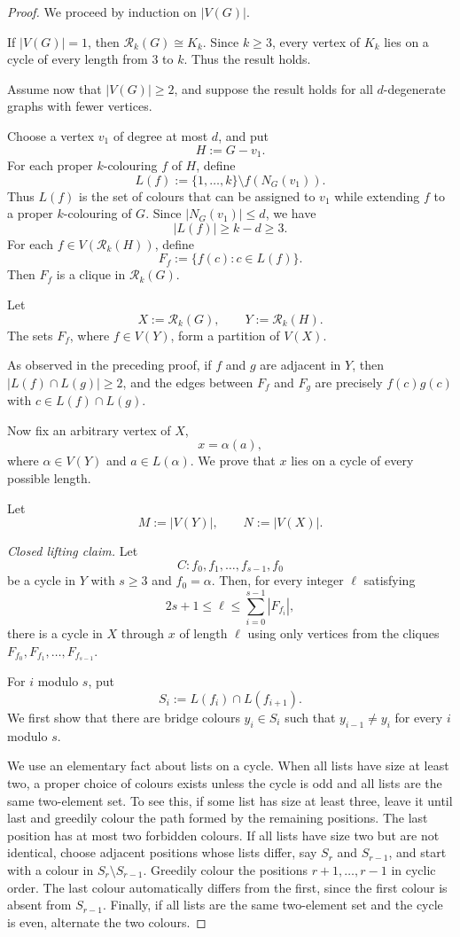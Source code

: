 \documentclass[11pt]{article}
\theoremstyle{remark}
\newcommand{\Rk}{\mathcal R_k}
\numberwithin{equation}{section}
\begin{document}
\begin{proof}
We proceed by induction on $|V(G)|$.

If $|V(G)|=1$, then $\Rk(G)\cong K_k$. Since $k\ge 3$,
every vertex of $K_k$ lies on a cycle of every length from $3$ to $k$.
Thus the result holds.

Assume now that $|V(G)|\ge 2$, and suppose the result holds for all
$d$-degenerate graphs with fewer vertices.

Choose a vertex $v_1$ of degree at most $d$, and put
\[
H:=G-v_1.
\]
For each proper $k$-colouring $f$ of $H$, define
\[
L(f):=\{1,\ldots,k\}\setminus f(N_G(v_1)).
\]
Thus $L(f)$ is the set of colours that can be assigned to $v_1$ while
extending $f$ to a proper $k$-colouring of $G$. Since
$|N_G(v_1)|\le d$, we have
\[
|L(f)|\ge k-d\ge 3.
\]
For each $f\in V(\Rk(H))$, define
\[
F_f:=\{f(c):c\in L(f)\}.
\]
Then $F_f$ is a clique in $\Rk(G)$.

Let
\[
X:=\Rk(G),\qquad Y:=\Rk(H).
\]
The sets $F_f$, where $f\in V(Y)$, form a partition of $V(X)$.

As observed in the preceding proof, if $f$ and $g$ are adjacent in $Y$,
then $|L(f)\cap L(g)|\ge 2$, and the edges between $F_f$ and $F_g$ are
precisely $f(c)g(c)$ with $c\in L(f)\cap L(g)$.

Now fix an arbitrary vertex of $X$,
\[
x=\alpha(a),
\]
where $\alpha\in V(Y)$ and $a\in L(\alpha)$.
We prove that $x$ lies on a cycle of every possible length.

Let
\[
M:=|V(Y)|,\qquad N:=|V(X)|.
\]

\smallskip

\noindent\textit{Closed lifting claim.}
Let
\[
C:f_0,f_1,\ldots,f_{s-1},f_0
\]
be a cycle in $Y$ with $s\ge3$ and $f_0=\alpha$. Then, for every integer $\ell$
satisfying
\[
2s+1\le \ell\le \sum_{i=0}^{s-1}|F_{f_i}|,
\]
there is a cycle in $X$ through $x$ of length $\ell$ using only vertices
from the cliques $F_{f_0},F_{f_1},\ldots,F_{f_{s-1}}$.

For $i$ modulo $s$, put
\[
S_i:=L(f_i)\cap L(f_{i+1}).
\]
We first show that there are bridge colours $y_i\in S_i$ such that
$y_{i-1}\ne y_i$ for every $i$ modulo $s$.

We use an elementary fact about lists on a cycle. When all lists have
size at least two, a proper choice of colours exists unless the cycle
is odd and all lists are the same two-element set. To see this, if
some list has size at least three, leave it until last and greedily
colour the path formed by the remaining positions. The last position
has at most two forbidden colours. If all lists have size two but are
not identical, choose adjacent positions whose lists differ, say
$S_r$ and $S_{r-1}$, and start with a colour in
$S_r\setminus S_{r-1}$. Greedily colour the positions
$r+1,\ldots,r-1$ in cyclic order. The last colour automatically
differs from the first, since the first colour is absent from
$S_{r-1}$. Finally, if all lists are the same two-element set and the
cycle is even, alternate the two colours.


\end{proof}
\end{document}
